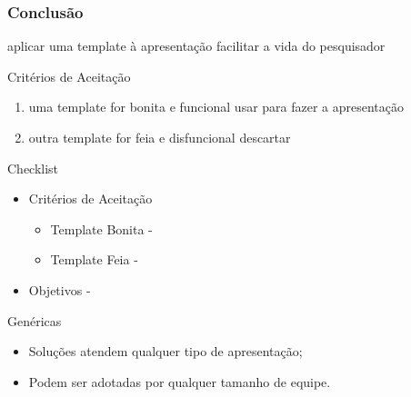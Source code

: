\documentclass[usenames,dvipsnames]{gt-beamer}
\begin{document}
    \begin{frame}[allowframebreaks]
        \frametitle{Conclusão}

        \usStory
            {aplicar uma template à apresentação}
            {facilitar a vida do pesquisador}

        \begin{block}{Critérios de Aceitação}
            \begin{enumerate}
                \item
                    \usCriteria
                        {uma template}
                        {for bonita e funcional}
                        {usar para fazer a apresentação}
                \item
                    \usCriteria
                        {outra template}
                        {for feia e disfuncional}
                        {descartar}
            \end{enumerate}
        \end{block}

        \begin{block}{Checklist}
            \begin{itemize}
                \item Critérios de Aceitação
                    \begin{itemize}
                        \item Template Bonita - \color{green}\color{black}
                        \item Template Feia - \color{red}\color{black}
                    \end{itemize}
                \item Objetivos - \color{green}\color{black}
            \end{itemize}
        \end{block}

        \framebreak

        \begin{block}{Genéricas}
            \begin{itemize}
                \item Soluções atendem qualquer tipo de apresentação;
                \item Podem ser adotadas por qualquer tamanho de equipe.
            \end{itemize}
        \end{block}



\end{frame}
\end{document}
